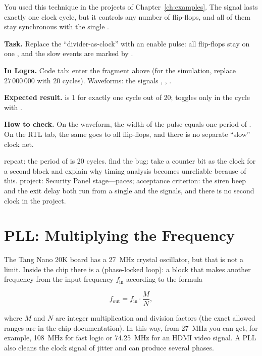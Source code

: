 You used this technique in the projects of Chapter~\ref{ch:examples}. The
 signal lasts exactly one clock cycle, but it controls any number
of flip-flops, and all of them stay synchronous with the single .

\begin{diybox}
\textbf{Task.} Replace the ``divider-as-clock'' with an enable pulse: all flip-flops stay on one , and the slow events are marked by .

\textbf{In Logra.} Code tab: enter the fragment above (for the simulation, replace $27\,000\,000$ with 20 cycles). Waveforms: the signals , , .

\textbf{Expected result.}  is 1 for exactly one cycle out of 20;  toggles only in the cycle with .

\textbf{How to check.} On the waveform, the width of the  pulse equals one period of . On the RTL tab, the same  goes to all flip-flops, and there is no separate ``slow'' clock net.

 repeat: the period of  is 20 cycles.  find the bug: take a counter bit as the clock for a second block and explain why timing analysis becomes unreliable because of this.  project: Security Panel stage---paces; acceptance criterion: the siren beep and the exit delay both run from a single  and the  signals, and there is no second clock in the project.
\end{diybox}

\section{PLL: Multiplying the Frequency}

The Tang Nano 20K board has a 27~MHz crystal oscillator, but that is not a
limit. Inside the chip there is a  (phase-locked loop): a block that
makes another frequency from the input frequency $f_{\text{in}}$ according to
the formula

\[
f_{\text{out}} = f_{\text{in}}\cdot\frac{M}{N},
\]

where $M$ and $N$ are integer multiplication and division factors (the exact
allowed ranges are in the chip documentation). In this way, from 27~MHz you
can get, for example, 108~MHz for fast logic or 74.25~MHz for an HDMI video
signal. A PLL also cleans the clock signal of jitter and can produce several
phases.

